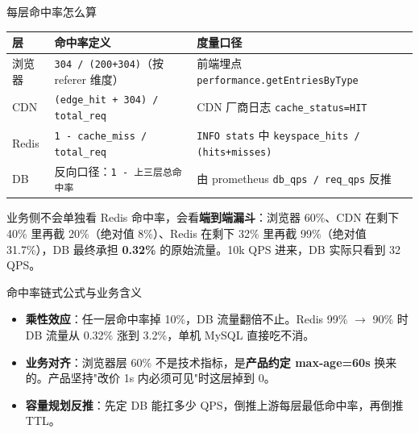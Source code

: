 \documentclass[aspectratio=169,11pt]{beamer}
\begin{document}
\begin{frame}[shrink]{每层命中率怎么算}
\begin{center}
\footnotesize
\begin{tabular}{@{}lp{4.4cm}p{5.0cm}@{}}
\toprule
层 & 命中率定义 & 度量口径 \\
\midrule
浏览器 & \texttt{304 / (200+304)}（按 referer 维度） & 前端埋点 \texttt{performance.getEntriesByType} \\
CDN    & \texttt{(edge\_hit + 304) / total\_req}    & CDN 厂商日志 \texttt{cache\_status=HIT} \\
Redis  & \texttt{1 - cache\_miss / total\_req}      & \texttt{INFO stats} 中 \texttt{keyspace\_hits / (hits+misses)} \\
DB     & 反向口径：\texttt{1 - 上三层总命中率}      & 由 prometheus \texttt{db\_qps / req\_qps} 反推 \\
\bottomrule
\end{tabular}
\end{center}
\vspace{2mm}

{\small 业务侧不会单独看 Redis 命中率，会看\textbf{端到端漏斗}：浏览器 60\%、CDN 在剩下 40\% 里再截 20\%（绝对值 8\%）、Redis 在剩下 32\% 里再截 99\%（绝对值 31.7\%），DB 最终承担 \textbf{0.32\%} 的原始流量。10k QPS 进来，DB 实际只看到 32 QPS。}
\end{frame}

\begin{frame}[shrink]{命中率链式公式与业务含义}
\begin{itemize}
  \item \textbf{乘性效应}：任一层命中率掉 10\%，DB 流量翻倍不止。Redis 99\% $\to$ 90\% 时 DB 流量从 0.32\% 涨到 3.2\%，单机 MySQL 直接吃不消。
  \item \textbf{业务对齐}：浏览器层 60\% 不是技术指标，是\textbf{产品约定 max-age=60s} 换来的。产品坚持"改价 1s 内必须可见"时这层掉到 0。
  \item \textbf{容量规划反推}：先定 DB 能扛多少 QPS，倒推上游每层最低命中率，再倒推 TTL。
\end{itemize}
\end{frame}
\end{document}
